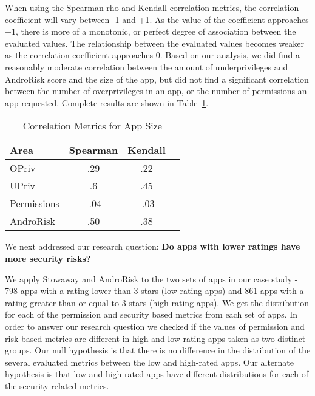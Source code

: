 \documentclass{sig-alternate}
\begin{document}
When using the Spearman rho and Kendall correlation metrics, the correlation coefficient will vary between -1 and +1. As the value of the coefficient approaches $\pm$1, there is more of a monotonic, or perfect degree of association between the evaluated values. The relationship between the evaluated values becomes weaker as the correlation coefficient approaches 0. Based on our analysis, we did find a reasonably moderate correlation between the amount of underprivileges and AndroRisk score and the size of the app, but did not find a significant correlation between the number of overprivileges in an app, or the number of permissions an app requested. Complete results are shown in Table~\ref{table:appCorrelationMetrics}.


\begin{table}[h]
\centering
\caption{Correlation Metrics for App Size}
  \begin{tabular}{ | l | c | c | c |  } \hline
 \bfseries Area  & \bfseries Spearman & \bfseries Kendall \\ \hline \hline

    OPriv & .29 & .22 \\ \hline
    UPriv & .6 & .45 \\ \hline
    Permissions & -.04 & -.03 \\ \hline
    AndroRisk & .50 & .38 \\ \hline

 \end{tabular}
\label{table:appCorrelationMetrics}
\end{table}




We next addressed our research question:
{\bf Do apps with lower ratings have more security risks?}






We apply Stowaway and AndroRisk to the two sets of apps in our case study - 798 apps with a rating lower than 3 stars (low rating apps) and 861 apps with a rating greater than or equal to 3 stars (high rating apps). We get the distribution for each of the permission and security based metrics from each set of apps. In order to answer our research question we checked if the values of permission and risk based metrics are different in high and low rating apps taken as two distinct groups. Our null hypothesis is that there is no difference in the distribution of the several evaluated metrics between the low and high-rated apps. Our alternate hypothesis is that low and high-rated apps have different distributions for each of the security related metrics.
\end{document}
